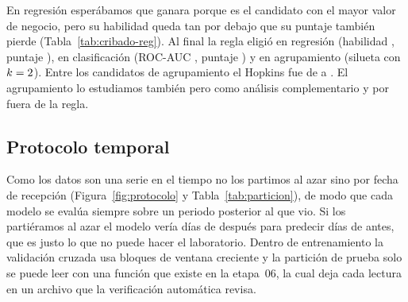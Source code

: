 \begin{table}[!htbp]
\centering
{}
\caption{Cribado de los análisis de regresión (solo entrenamiento). La
habilidad es la media entre bloques de $1-\mathrm{RMSE}/\mathrm{RMSE}_\text{base}$,
la columna ``Regla'' es la fracción de esa habilidad que logra la mejor
variable sola y la observación dice por qué un candidato no es elegible.}
\label{tab:cribado-reg}
\end{table}

\begin{table}[!htbp]
\centering
{}
\caption{Cribado de los análisis de clasificación (solo entrenamiento).
``Positivos'' es la tasa de la clase positiva, la habilidad es la media entre
bloques de $2\,\mathrm{AUC}-1$ y una ``Regla'' mayor que 1 indica que la
variable sola supera al modelo.}
\label{tab:cribado-clf}
\end{table}

En regresión esperábamos que ganara  porque
es el candidato con el mayor valor de negocio, pero su habilidad queda tan
por debajo que su puntaje también pierde (Tabla~\ref{tab:cribado-reg}). Al
final la regla eligió \codigo{\CriSeleccionReg} en regresión (habilidad
\CriSeleccionRegHabilidad{}, puntaje \CriSeleccionRegPuntaje{}),
\codigo{\CriSeleccionClf} en clasificación (ROC-AUC \CriSeleccionClfAUC{},
puntaje \CriSeleccionClfPuntaje{}) y \codigo{\CriSeleccionAgr} en
agrupamiento (silueta \CriSeleccionAgrSilueta{} con $k=2$).
Entre los candidatos de agrupamiento el Hopkins fue de \CriHopkinsMin{} a
\CriHopkinsMax{}. El agrupamiento \codigo{\CriAgrComplementario} lo
estudiamos también pero como análisis complementario y por fuera de la regla.

\subsection{Protocolo temporal}
\label{sec:protocolo}

Como los datos son una serie en el tiempo no los partimos al azar sino por
fecha de recepción (Figura~\ref{fig:protocolo} y Tabla~\ref{tab:particion}),
de modo que cada modelo se evalúa siempre sobre un periodo posterior al que
vio. Si los partiéramos al azar el modelo vería días de después para predecir
días de antes, que es justo lo que no puede hacer el laboratorio. Dentro de
entrenamiento la validación cruzada usa bloques de ventana creciente y la
partición de prueba solo se puede leer con una función que existe en la
etapa~06, la cual deja cada lectura en un archivo que la verificación
automática revisa.

